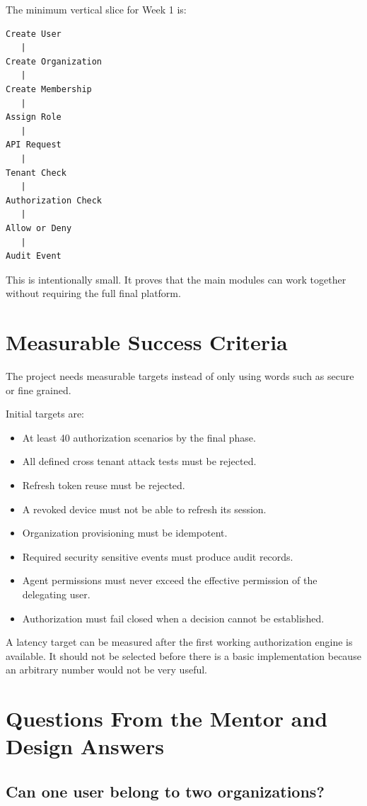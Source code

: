 \documentclass[11pt,a4paper]{article}
\begin{document}
The minimum vertical slice for Week 1 is:

\begin{verbatim}
Create User
   |
Create Organization
   |
Create Membership
   |
Assign Role
   |
API Request
   |
Tenant Check
   |
Authorization Check
   |
Allow or Deny
   |
Audit Event
\end{verbatim}

This is intentionally small. It proves that the main modules can work together without requiring the full final platform.

\section{Measurable Success Criteria}

The project needs measurable targets instead of only using words such as secure or fine grained.

Initial targets are:

\begin{itemize}
    \item At least 40 authorization scenarios by the final phase.
    \item All defined cross tenant attack tests must be rejected.
    \item Refresh token reuse must be rejected.
    \item A revoked device must not be able to refresh its session.
    \item Organization provisioning must be idempotent.
    \item Required security sensitive events must produce audit records.
    \item Agent permissions must never exceed the effective permission of the delegating user.
    \item Authorization must fail closed when a decision cannot be established.
\end{itemize}

A latency target can be measured after the first working authorization engine is available. It should not be selected before there is a basic implementation because an arbitrary number would not be very useful.

\section{Questions From the Mentor and Design Answers}

\subsection{Can one user belong to two organizations?}
\end{document}
